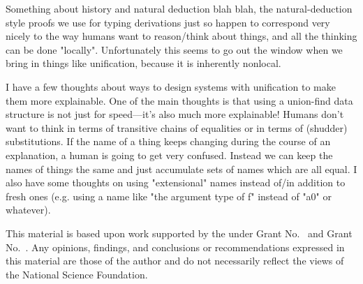 \documentclass[sigplan, screen]{acmart}\settopmatter{printccs=false,printacmref=false}
\begin{document}
Something about history and natural deduction blah blah, the natural-deduction style proofs we use for typing derivations just so happen to correspond very nicely to the way humans want to reason/think about things, and all the thinking can be done "locally".  Unfortunately this seems to go out the window when we bring in things like unification, because it is inherently nonlocal.

I have a few thoughts about ways to design systems with unification to make them more explainable.  One of the main thoughts is that using a union-find data structure is not just for speed---it's also much more explainable!  Humans don't want to think in terms of transitive chains of equalities or in terms of (shudder) substitutions.  If the name of a thing keeps changing during the course of an explanation, a human is going to get very confused.  Instead we can keep the names of things the same and just accumulate sets of names which are all equal.  I also have some thoughts on using "extensional" names instead of/in addition to fresh ones (e.g. using a name like "the argument type of f" instead of "a0" or whatever).



\begin{acks}                            %
  This material is based upon work supported by the
   under Grant
  No.~ and Grant
  No.~.  Any opinions, findings, and
  conclusions or recommendations expressed in this material are those
  of the author and do not necessarily reflect the views of the
  National Science Foundation.
\end{acks}


%
\end{document}
